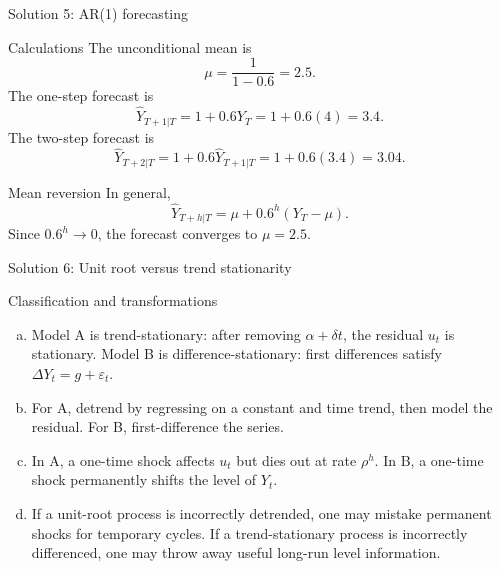 \documentclass[10pt]{beamer}
\newcommand{\eps}{\varepsilon}
\begin{document}
\begin{frame}{Solution 5: AR(1) forecasting}
\label{s5}
\small
\begin{exampleblock}{Calculations}
The unconditional mean is
\[
\mu=\frac{1}{1-0.6}=2.5.
\]
The one-step forecast is
\[
\widehat Y_{T+1|T}=1+0.6Y_T=1+0.6(4)=3.4.
\]
The two-step forecast is
\[
\widehat Y_{T+2|T}=1+0.6\widehat Y_{T+1|T}
=1+0.6(3.4)=3.04.
\]
\end{exampleblock}

\begin{block}{Mean reversion}
In general,
\[
\widehat Y_{T+h|T}=\mu+0.6^h(Y_T-\mu).
\]
Since $0.6^h\to 0$, the forecast converges to $\mu=2.5$.
\end{block}
\vfill
\hfill\hyperlink{q5}{}
\end{frame}

\begin{frame}{Solution 6: Unit root versus trend stationarity}
\label{s6}
\small
\begin{exampleblock}{Classification and transformations}
\begin{enumerate}[(a)]
  \item Model A is trend-stationary: after removing $\alpha+\delta t$, the residual $u_t$ is stationary. Model B is difference-stationary: first differences satisfy $\Delta Y_t=g+\eps_t$.
  \item For A, detrend by regressing on a constant and time trend, then model the residual. For B, first-difference the series.
  \item In A, a one-time shock affects $u_t$ but dies out at rate $\rho^h$. In B, a one-time shock permanently shifts the level of $Y_t$.
  \item If a unit-root process is incorrectly detrended, one may mistake permanent shocks for temporary cycles. If a trend-stationary process is incorrectly differenced, one may throw away useful long-run level information.
\end{enumerate}
\end{exampleblock}
\vfill
\hfill\hyperlink{q6}{}
\end{frame}
\end{document}
